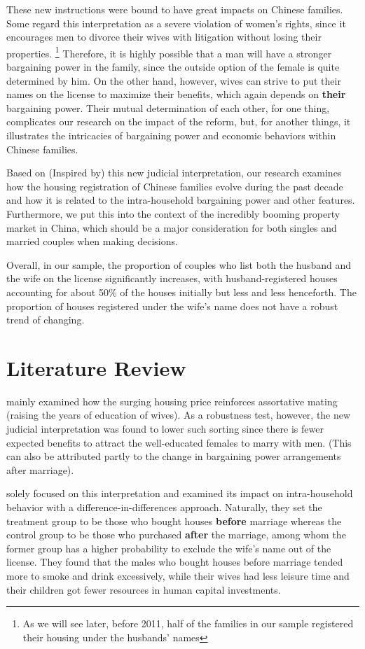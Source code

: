 \documentclass[11pt]{article}
\begin{document}
These new instructions were bound to have great impacts on Chinese families. Some regard this interpretation as a severe violation of women's rights, since it encourages men to divorce their wives with litigation without losing their properties. \footnote{As we will see later, before 2011, half of the families in our sample registered their housing under the husbands' names} Therefore, it is highly possible that a man will have a stronger bargaining power in the family, since the outside option of the female is quite determined by him. On the other hand, however, wives can strive to put their names on the license to maximize their benefits, which again depends on \textbf{their} bargaining power. Their mutual determination of each other, for one thing, complicates our research on the impact of the reform, but, for another things, it illustrates the intricacies of bargaining power and economic behaviors within Chinese families.

Based on (Inspired by) this new judicial interpretation, our research examines how the housing registration of Chinese families evolve during the past decade and how it is related to the intra-household bargaining power and other features. Furthermore, we put this into the context of the incredibly booming property market in China, which should be a major consideration for both singles and married couples when making decisions.

Overall, in our sample, the proportion of couples who list both the husband and the wife on the license significantly increases, with husband-registered houses accounting for about 50\% of the houses initially but less and less henceforth. The proportion of houses registered under the wife's name does not have a robust trend of changing.

\section{Literature Review} \label{sec:literature}
\citet{SUN2020102492} mainly examined how the surging housing price reinforces assortative mating (raising the years of education of wives). As a robustness test, however, the new judicial interpretation was found to lower such sorting since there is fewer expected benefits to attract the well-educated females to marry with men. (This can also be attributed partly to the change in bargaining power arrangements after marriage).

\citet{WANG2014192} solely focused on this interpretation and examined its impact on intra-household behavior 
with a difference-in-differences approach. Naturally, they set the treatment group to be those who bought houses \textbf{before} marriage whereas the control group to be those who purchased \textbf{after} the marriage, among whom the former group has a higher probability to exclude the wife's name out of the license. They found that the males who bought houses before marriage tended more to smoke and drink excessively, while their wives had less leisure time and their children got fewer resources in human capital investments. 
\end{document}

